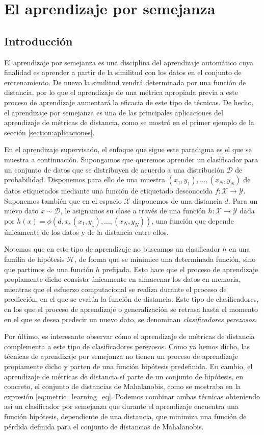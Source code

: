 \section{El aprendizaje por semejanza}

\subsection{Introducción}

El aprendizaje por semejanza es una disciplina del aprendizaje automático cuya finalidad es aprender a partir de la similitud con los datos en el conjunto de entrenamiento. De nuevo la similitud vendrá determinada por una función de distancia, por lo que el aprendizaje de una métrica apropiada previa a este proceso de aprendizaje aumentará la eficacia de este tipo de técnicas. De hecho, el aprendizaje por semejanza es una de las principales aplicaciones del aprendizaje de métricas de distancia, como se mostró en el primer ejemplo de la sección \ref{section:aplicaciones}.

En el aprendizaje supervisado, el enfoque que sigue este paradigma es el que se muestra a continuación. Supongamos que queremos aprender un clasificador para un conjunto de datos que se distribuyen de acuerdo a una distribución $\mathcal{D}$ de probabilidad. Disponemos para ello de una muestra $(x_1,y_1),\dots,(x_N,y_N)$ de datos etiquetados mediante una función de etiquetado desconocida $f\colon \mathcal{X} \to \mathcal{Y}$. Suponemos también que en el espacio $\mathcal{X}$ disponemos de una distancia $d$. Para un nuevo dato $x \sim \mathcal{D}$, le asignamos su clase a través de una función $h \colon \mathcal{X} \to \mathcal{Y}$ dada por $h(x) = \phi(d,x,(x_1,y_1),\dots,(x_N,y_N))$, una función que depende únicamente de los datos y de la distancia entre ellos.

Notemos que en este tipo de aprendizaje no buscamos un clasificador $h$ en una familia de hipótesis $\mathcal{H}$, de forma que se minimice una determinada función, sino que partimos de una función $h$ prefijada. Esto hace que el proceso de aprendizaje propiamente dicho consista únicamente en almacenar los datos en memoria, mientras que el esfuerzo computacional se realiza durante el proceso de predicción, en el que se evalúa la función de distancia. Este tipo de clasificadores, en los que el proceso de aprendizaje o generalización se retrasa hasta el momento en el que se desea predecir un nuevo dato, se denominan \emph{clasificadores perezosos}.

Por último, es interesante observar cómo el aprendizaje de métricas de distancia complementa a este tipo de clasificadores perezosos. Como ya hemos dicho, las técnicas de aprendizaje por semejanza no tienen un proceso de aprendizaje propiamente dicho y parten de una función hipótesis predefinida. En cambio, el aprendizaje de métricas de distancia sí parte de un conjunto de hipótesis, en concreto, el conjunto de distancias de Mahalanobis, como se mostraba en la expresión \ref{eq:metric_learning_eq}. Podemos combinar ambas técnicas obteniendo así un clasificador por semejanza que durante el aprendizaje encuentra una función hipótesis, dependiente de una distancia, que minimiza una función de pérdida definida para el conjunto de distancias de Mahalanobis.

